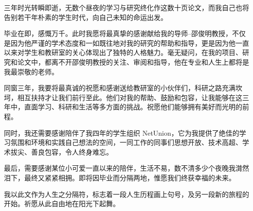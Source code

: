 
\thesisacknowledgement

三年时光转瞬即逝，无数个昼夜的学习与研究终化作这数十页论文，而我自己也将告别若干年朴素的学生时代，向自己未知的命运出发。

毕业在即，感慨万千。此时我愿将最真挚的感谢献给我的导师--邵俊明教授，不仅是因为他严谨的学术态度和一如既往地对我的研究的帮助和指导，更是因为他一直以来对学生和教研室的关心体现出了独特的人格魅力。毫无疑问，在我的项目、研究和论文中，都离不开邵俊明教授的关注、审阅和指导，他在专业和人生上都将是我最崇敬的老师。

同窗三年，我要将最真诚的祝愿和感谢送给教研室的小伙伴们，科研之路充满坎坷，相互扶持才让我们前行至此。他们对我的帮助、鼓励和包容，让我能够在这三年中，直面学习、科研和生活等多方面的挑战。祝愿他们能够拥有美好而光明的前程。

同时，我还需要感谢陪伴了我四年的学生组织 NetUnion，它为我提供了绝佳的学习氛围和环境和实践自己想法的空间，一同工作的同事们思想开放、技术高超、学术拔尖、善良包容，令人终身难忘。

最后，需要感谢某位小可爱一直以来的陪伴，生活不易，数不清多少个夜晚我潸然泪下，最终又紧紧相拥。即将因毕业而分隔两地，惟愿我们终获幸福的未来。

我以此文作为人生之分隔符，标志着一段人生历程画上句号，及另一段新的旅程的开始。祈愿从此自由地在阳光下起舞。
